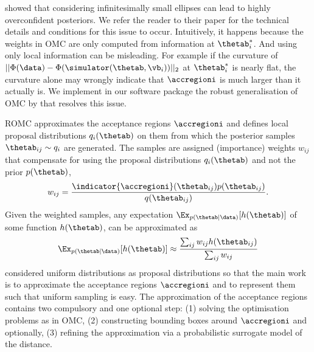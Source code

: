 \citet{Ikonomov2019} showed that considering infinitesimally small ellipses can lead
to highly overconfident posteriors. We refer the reader to their paper
for the technical details and conditions for this issue to
occur. Intuitively, it happens because the weights in OMC are only
computed from information at $\thetab_i^*$. And using only local
information can be misleading. For example if the curvature of
$||\Phi(\data)-\Phi(\simulator(\thetab, \vb_i))||_2$ at $\thetab_i^*$
is nearly flat, the curvature alone may wrongly indicate that
$\accregioni$ is much larger than it actually is. We implement in our
software package the robust generalisation of OMC
by \citet{Ikonomov2019} that resolves this issue.

ROMC approximates the acceptance regions $\accregioni$ and defines
local proposal distributions $q_i(\thetab)$ on them from which the
posterior samples $\thetab_{ij} \sim q_i$ are generated. The samples
are assigned (importance) weights $w_{ij}$ that compensate for using
the proposal distributions $q_i(\thetab)$ and not the prior
$p(\thetab)$,
\begin{equation}
  w_{ij} = \frac{\indicator{\accregioni}(\thetab_{ij}) p(\thetab_{ij})}{q(\thetab_{ij})}.
  \label{eq:sampling}
\end{equation}
Given the weighted samples, any expectation
$\Ex_{p(\thetab|\data)}[h(\thetab)]$ of some function $h(\thetab)$, can be approximated as
\begin{equation} \label{eq:expectation}
  \Ex_{p(\thetab|\data)}[h(\thetab)] \approx \frac{\sum_{ij} w_{ij} h(\thetab_{ij})}{\sum_{ij} w_{ij}}
\end{equation}
\citet{Ikonomov2019} considered uniform distributions as proposal
distributions so that the main work is to approximate the acceptance
regions $\accregioni$ and to represent them such that uniform sampling is
easy. The approximation of the acceptance regions contains two compulsory
and one optional step: (1) solving the optimisation problems as in OMC, (2)
constructing bounding boxes around $\accregioni$ and optionally, (3)
refining the approximation via a probabilistic surrogate model of the distance.

